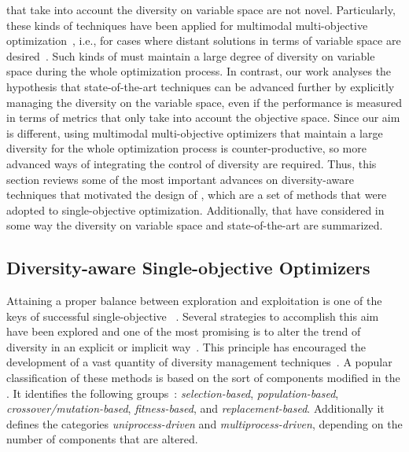 \MOEAS{} that take into account the diversity on variable space are not novel.
%
Particularly, these kinds of techniques have been applied for multimodal multi-objective optimization~\cite{Liang:16},
i.e., for cases where distant solutions in terms of variable space are desired~\cite{deb2008omni, cuate2019variation}.
%
Such kinds of \MOEAS{} must maintain a large degree of diversity on variable space during the whole optimization process.
%
In contrast, our work analyses the hypothesis that state-of-the-art techniques can be advanced further by explicitly managing
the diversity on the variable space, even if the performance is measured in terms of metrics that only take into account 
the objective space.
%
Since our aim is different, using multimodal multi-objective optimizers that maintain a large diversity 
for the whole optimization process is counter-productive, 
so more advanced ways of integrating the control of diversity are required.
%
Thus, this section reviews some of the most important advances on diversity-aware techniques that motivated the
design of \AVSDMOEAD{}, which are a set of methods that were adopted to single-objective optimization.
%
Additionally, \MOEAS{} that have considered in some way the diversity on variable space and
state-of-the-art \MOEAS{} are summarized.

\subsection{Diversity-aware Single-objective Optimizers}

Attaining a proper balance between exploration and exploitation is one of the keys of successful single-objective
\EAS{}~\cite{lin2009auto}.
%
Several strategies to accomplish this aim have been explored and one of the most promising is to alter the trend
of diversity in an explicit or implicit way~\cite{Joel:Crepinsek}.
%
This principle has encouraged the development of a vast quantity of diversity management techniques~\cite{pandey2014comparative}.
%
A popular classification of these methods is based on the sort of components modified in the \EA{}.
%
It identifies the following groups~\cite{Joel:Crepinsek}: \textit{selection-based}, \textit{population-based}, \textit{crossover/mutation-based}, \textit{fitness-based}, and \textit{replacement-based}.
%
Additionally it defines the categories \textit{uniprocess-driven} and \textit{multiprocess-driven}, depending on the number
of components that are altered.

